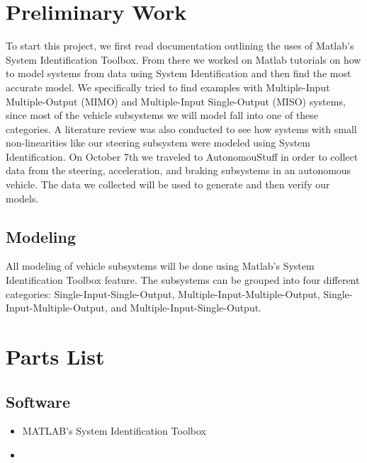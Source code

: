 \documentclass[letterpaper,12pt]{article}   %
\begin{document}
\section{Preliminary Work}
To start this project, we first read documentation outlining the uses of Matlab's System Identification Toolbox. From there we worked on Matlab tutorials on how to model systems from data using System Identification and then find the most accurate model. We specifically tried to find examples with Multiple-Input Multiple-Output (MIMO) and Multiple-Input Single-Output (MISO) systems, since most of the vehicle subsystems we will model fall into one of these categories. A literature review was also conducted to see how systems with small non-linearities like our steering subsystem were modeled using System Identification. On October 7th we traveled to AutonomouStuff in order to collect data from the steering, acceleration, and braking subsystems in an autonomous vehicle. The data we collected will be used to generate and then verify our models. 

 \subsection{Modeling} \label{sec:model}
 All modeling of vehicle subsystems will be done using Matlab's System Identification Toolbox feature. The subsystems can be grouped into four different categories: Single-Input-Single-Output, Multiple-Input-Multiple-Output, Single-Input-Multiple-Output, and Multiple-Input-Single-Output. 





\section{Parts List}
	\subsection{Software}
	\begin{itemize}
    \item MATLAB's System Identification Toolbox 
    \item  
 \end{itemize} 
	
\end{document}
